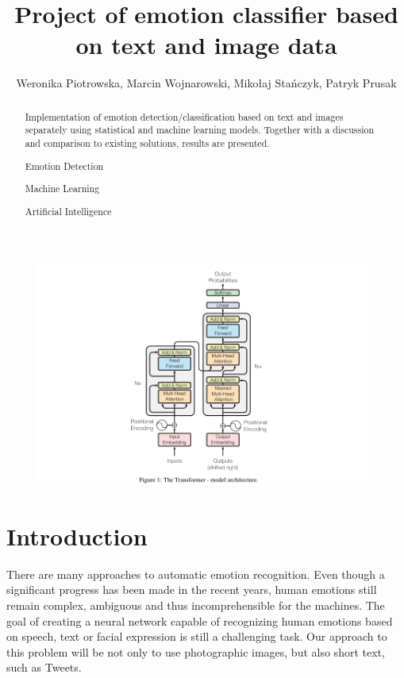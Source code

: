 \documentclass{ledger}
\title{Project of emotion classifier based on text and image data}
\author{\normalsize Weronika Piotrowska, Marcin Wojnarowski, Mikołaj Stańczyk, Patryk Prusak}
\begin{document}
\maketitle

\thispagestyle{pagefirst}

\begin{abstract}
	Implementation of emotion detection/classification based on text and images separately using statistical and machine learning models. Together with a discussion and comparison to existing solutions, results are presented.

	\begin{keywords}
		\item Emotion Detection
		\item Machine Learning
		\item Artificial Intelligence
	\end{keywords}
\end{abstract}
\begin{figure}[hb]
	\centering

	\includegraphics[width=\textwidth]{assets/transformer.png}
\end{figure}

\clearpage
\tableofcontents

\newpage

\section{Introduction}

There are many approaches to automatic emotion recognition. Even though a significant progress has been made in the recent years, human emotions still remain complex, ambiguous and thus incomprehensible for the machines. The goal of creating a neural network capable of recognizing human emotions based on speech, text or facial expression is still a challenging task. Our approach to this problem will be not only to use photographic images, but also short text, such as Tweets.
\end{document}
